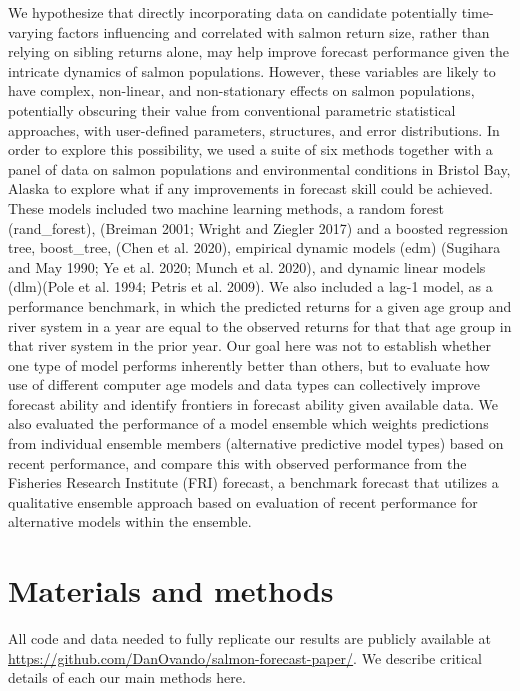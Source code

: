 \documentclass[
]{article}
\begin{document}
We hypothesize that directly incorporating data on candidate potentially time-varying factors influencing and correlated with salmon return size, rather than relying on sibling returns alone, may help improve forecast performance given the intricate dynamics of salmon populations. However, these variables are likely to have complex, non-linear, and non-stationary effects on salmon populations, potentially obscuring their value from conventional parametric statistical approaches, with user-defined parameters, structures, and error distributions. In order to explore this possibility, we used a suite of six methods together with a panel of data on salmon populations and environmental conditions in Bristol Bay, Alaska to explore what if any improvements in forecast skill could be achieved. These models included two machine learning methods, a random forest (rand\_forest), (Breiman 2001; Wright and Ziegler 2017) and a boosted regression tree, boost\_tree, (Chen et al. 2020), empirical dynamic models (edm) (Sugihara and May 1990; Ye et al. 2020; Munch et al. 2020), and dynamic linear models (dlm)(Pole et al. 1994; Petris et al. 2009). We also included a lag-1 model, as a performance benchmark, in which the predicted returns for a given age group and river system in a year are equal to the observed returns for that that age group in that river system in the prior year. Our goal here was not to establish whether one type of model performs inherently better than others, but to evaluate how use of different computer age models and data types can collectively improve forecast ability and identify frontiers in forecast ability given available data. We also evaluated the performance of a model ensemble which weights predictions from individual ensemble members (alternative predictive model types) based on recent performance, and compare this with observed performance from the Fisheries Research Institute (FRI) forecast, a benchmark forecast that utilizes a qualitative ensemble approach based on evaluation of recent performance for alternative models within the ensemble.

\hypertarget{materials-and-methods}{%
\section*{Materials and methods}\label{materials-and-methods}}

All code and data needed to fully replicate our results are publicly available at \url{https://github.com/DanOvando/salmon-forecast-paper/}. We describe critical details of each our main methods here.
\end{document}
